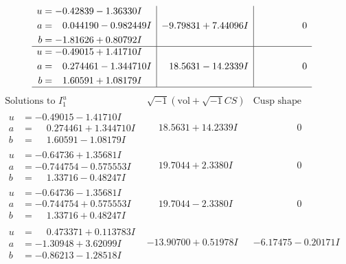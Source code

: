 \documentclass[1p]{elsarticle_modified}
\theoremstyle{definition}
\newcommand{\I}{\sqrt{-1}}
\begin{document}
$$\begin{array}{c|c|c}
\begin{aligned}
u &= -0.42839 - 1.36330 I \\
a &= \phantom{-}0.044190 - 0.982449 I \\
b &= -1.81626 + 0.80792 I\end{aligned}
 & -9.79831 + 7.44096 I & \phantom{-0.000000 } 0 \\ \hline\begin{aligned}
u &= -0.49015 + 1.41710 I \\
a &= \phantom{-}0.274461 - 1.344710 I \\
b &= \phantom{-}1.60591 + 1.08179 I\end{aligned}
 & \phantom{-}18.5631 - 14.2339 I & \phantom{-0.000000 } 0\\
 \hline 
 \end{array}$$\newpage$$\begin{array}{c|c|c}  
\text{Solutions to }I^u_{1}& \I (\text{vol} + \sqrt{-1}CS) & \text{Cusp shape}\\
 \hline 
\begin{aligned}
u &= -0.49015 - 1.41710 I \\
a &= \phantom{-}0.274461 + 1.344710 I \\
b &= \phantom{-}1.60591 - 1.08179 I\end{aligned}
 & \phantom{-}18.5631 + 14.2339 I & \phantom{-0.000000 } 0 \\ \hline\begin{aligned}
u &= -0.64736 + 1.35681 I \\
a &= -0.744754 - 0.575553 I \\
b &= \phantom{-}1.33716 - 0.48247 I\end{aligned}
 & \phantom{-}19.7044 + 2.3380 I & \phantom{-0.000000 } 0 \\ \hline\begin{aligned}
u &= -0.64736 - 1.35681 I \\
a &= -0.744754 + 0.575553 I \\
b &= \phantom{-}1.33716 + 0.48247 I\end{aligned}
 & \phantom{-}19.7044 - 2.3380 I & \phantom{-0.000000 } 0 \\ \hline\begin{aligned}
u &= \phantom{-}0.473371 + 0.113783 I \\
a &= -1.30948 + 3.62099 I \\
b &= -0.86213 - 1.28518 I\end{aligned}
 & -13.90700 + 0.51978 I & -6.17475 - 0.20171 I \\ \hline\begin{aligned}

\end{aligned}
\end{array}$$
\end{document}
